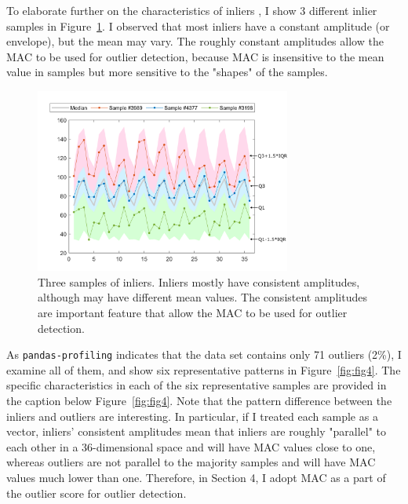 \documentclass[12pt]{article}
\begin{document}
\pagebreak
To elaborate further on the characteristics of inliers , I show 3 different inlier samples
in Figure~\ref{fig:fig3}.
I observed that most inliers have a constant amplitude (or envelope), but the mean may vary.
The roughly constant amplitudes allow the MAC to be used for outlier detection, because MAC is
insensitive to the mean value in samples but more sensitive to the "shapes" of the samples.

\begin{figure}[ht!]
\centering
\includegraphics[width=0.75\textwidth]{inlier}
\caption{Three samples of inliers. Inliers mostly have consistent amplitudes,
although may have different mean values.
The consistent amplitudes are important feature that allow the MAC to be used for outlier detection.}
\label{fig:fig3}
\end{figure}

\vspace{1ex}
As \texttt{pandas-profiling} indicates that the data set contains only 71 outliers (2\%),
I examine all of them, and show six representative patterns in Figure~\ref{fig:fig4}.
The specific characteristics in each of the six representative samples are provided in the caption below 
Figure~\ref{fig:fig4}.
Note that the pattern difference between the inliers and outliers are interesting.
In particular, if I treated each sample as a vector, inliers' consistent amplitudes 
mean that inliers are roughly "parallel" to each other in a 36-dimensional space 
and will have MAC values close to one, whereas outliers are not parallel to the majority samples
and will have MAC values much lower than one. Therefore, in Section 4, I adopt MAC as a part of
the outlier score for outlier detection.
\end{document}
